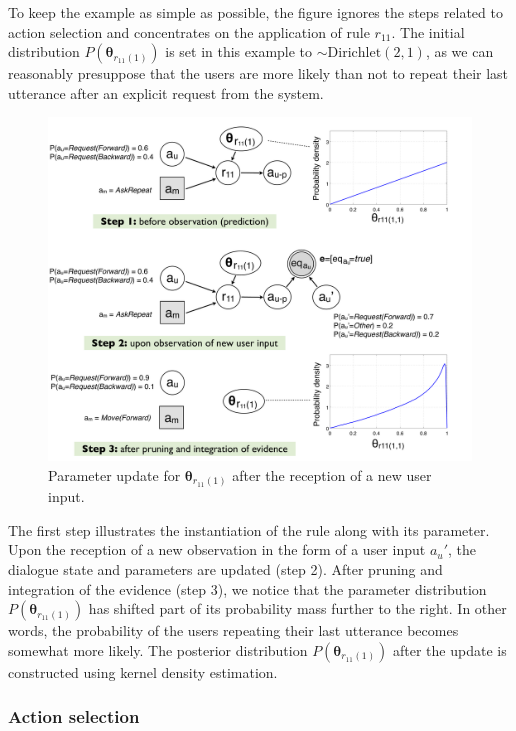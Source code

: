 To keep the example as simple as possible, the figure ignores the steps related to action selection and concentrates on the application of rule $r_{11}$.  The initial distribution $P(\boldsymbol\theta_{r_{11}(1)})$ is set in this example to $\sim \mathrm{Dirichlet}(2,1)$, as we can reasonably presuppose that the users are more likely than not to repeat their last utterance after an explicit request from the system.

\begin{figure}[h]
\centering
\includegraphics[scale=0.30]{imgs/learningexample.pdf}
\caption{Parameter update for $\boldsymbol\theta_{r_{11}(1)}$ after the reception of a new user input. }
\label{fig:learningexample}
\end{figure}

The first step illustrates the instantiation of the rule along with its parameter. Upon the reception of a new observation in the form of a user input $a_u'$, the dialogue state and parameters are updated (step 2). After pruning and integration of the evidence (step 3), we notice that the parameter distribution $P(\boldsymbol\theta_{r_{11}(1)})$ has shifted part of its probability mass further to the right. In other words, the probability of the users repeating their last utterance becomes somewhat more likely. The posterior distribution $P(\boldsymbol\theta_{r_{11}(1)})$ after the update is constructed using kernel density estimation. 

\subsubsection*{Action selection}

